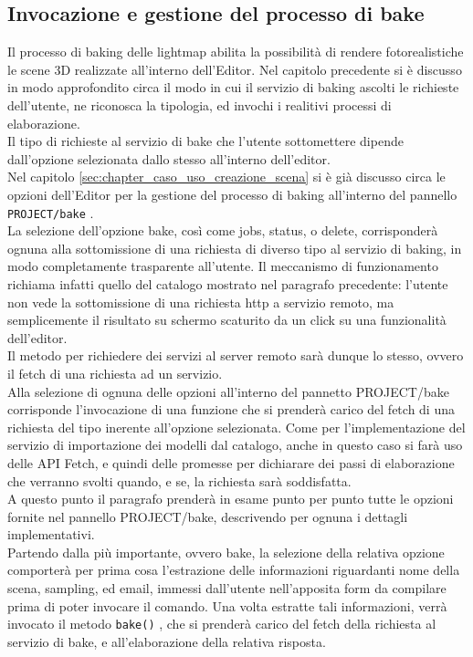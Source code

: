 \subsection{Invocazione e gestione del processo di bake}
\label{sec:chapter_creazione_scena_funzionalita_editor_bake}
Il processo di baking delle lightmap abilita la possibilità di rendere fotorealistiche le scene 3D realizzate all’interno dell’Editor. Nel capitolo precedente si è discusso in modo approfondito circa il modo in cui il servizio di baking ascolti le richieste dell’utente, ne riconosca la tipologia, ed invochi i realitivi processi di elaborazione.
\\ 
Il tipo di richieste al servizio di bake che l’utente sottomettere dipende dall’opzione selezionata dallo stesso all’interno dell’editor.
\\ 
Nel capitolo \ref{sec:chapter_caso_uso_creazione_scena} si è già discusso circa le opzioni dell’Editor per la gestione del processo di baking all’interno del pannello \texttt{PROJECT/bake} .
\\
La selezione dell’opzione bake, così come jobs, status, o delete, corrisponderà ognuna alla sottomissione di una richiesta di diverso tipo al servizio di baking, in modo completamente trasparente all’utente. Il meccanismo di funzionamento richiama infatti quello del catalogo mostrato nel paragrafo precedente: l’utente non vede la sottomissione di una richiesta http a servizio remoto, ma semplicemente il risultato su schermo scaturito da un click su una funzionalità dell'editor.
\\
Il metodo per richiedere dei servizi al server remoto sarà dunque lo stesso, ovvero il fetch di una richiesta ad un servizio.
\\ 
Alla selezione di ognuna delle opzioni all’interno del pannetto PROJECT/bake corrisponde l’invocazione di una funzione che si prenderà carico del fetch di una richiesta del tipo inerente all’opzione selezionata. Come per l’implementazione del servizio di importazione dei modelli dal catalogo, anche in questo caso si farà uso delle API Fetch, e quindi delle promesse per dichiarare dei passi di elaborazione che verranno svolti quando, e se, la richiesta sarà soddisfatta.
\\ 
A questo punto il paragrafo prenderà in esame punto per punto tutte le opzioni fornite nel pannello PROJECT/bake, descrivendo per ognuna i dettagli implementativi.
\\
Partendo dalla più importante, ovvero bake, la selezione della relativa opzione comporterà per prima cosa l’estrazione delle informazioni riguardanti nome della scena, sampling, ed email, immessi dall’utente nell’apposita form da compilare prima di poter invocare il comando. Una volta estratte tali informazioni, verrà invocato il metodo \texttt{bake()} , che si prenderà carico del fetch della richiesta al servizio di bake, e all’elaborazione della relativa risposta.
